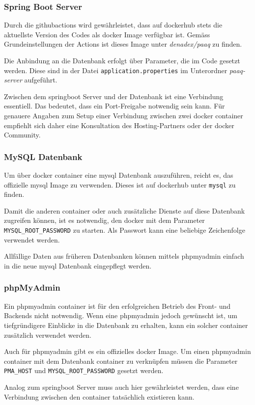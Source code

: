 \documentclass[../main.tex]{subfiles}
\begin{document}
	\subsubsection{Spring Boot Server}
	\par \noindent Durch die \gls{githubactions} wird gewährleistet, dass auf \gls{dockerhub} stets die aktuellste Version des Codes als \gls{docker} Image verfügbar ist. Gemäss Grundeinstellungen der Actions ist dieses Image unter \textit{denadex/paaq} zu finden. 
	\par \noindent Die Anbindung an die Datenbank erfolgt über Parameter, die im Code gesetzt werden. Diese sind in der Datei \texttt{application.properties} im Unterordner \textit{paaq-server} aufgeführt.
	\par \noindent Zwischen dem \gls{springboot} Server und der Datenbank ist eine Verbindung essentiell. Das bedeutet, dass ein Port-Freigabe notwendig sein kann. Für genauere Angaben zum Setup einer Verbindung zwischen zwei \gls{docker} \gls{container} empfiehlt sich daher eine Konsultation des Hosting-Partners oder der \gls{docker} Community.
	
	\subsubsection{MySQL Datenbank}
	\par \noindent Um über \gls{docker} \gls{container}  eine \gls{mysql} Datenbank auszuführen, reicht es, das offizielle \gls{mysql} Image zu verwenden. Dieses ist auf \gls{dockerhub} unter \texttt{mysql} zu finden.
	\par \noindent Damit die anderen \gls{container} oder auch zusätzliche Dienste auf diese Datenbank zugreifen können, ist es notwendig, den \gls{docker} mit dem Parameter \texttt{MYSQL\_ROOT\_PASSWORD} zu starten. Als Passwort kann eine beliebige Zeichenfolge verwendet werden.
	\par \noindent Allfällige Daten aus früheren Datenbanken können mittels \gls{phpmyadmin} einfach in die neue \gls{mysql} Datenbank eingepflegt werden.
	
	\subsubsection{phpMyAdmin}
	\par \noindent Ein \gls{phpmyadmin} \gls{container} ist für den erfolgreichen Betrieb des Front- und Backends nicht notwendig. Wenn eine \gls{phpmyadmin} jedoch gewünscht ist, um tiefgründigere Einblicke in die Datenbank zu erhalten, kann ein solcher \gls{container} zusätzlich verwendet werden.
	\par \noindent Auch für \gls{phpmyadmin} gibt es ein offizielles \gls{docker} Image. Um einen \gls{phpmyadmin} \gls{container} mit dem Datenbank \gls{container} zu verknüpfen müssen die Parameter \texttt{PMA\_HOST} und \texttt{MYSQL\_ROOT\_PASSWORD} gesetzt werden.
	\par \noindent Analog zum \gls{springboot} Server muss auch hier gewährleistet werden, dass eine Verbindung zwischen den \gls{container} tatsächlich existieren kann.
	
\end{document}
